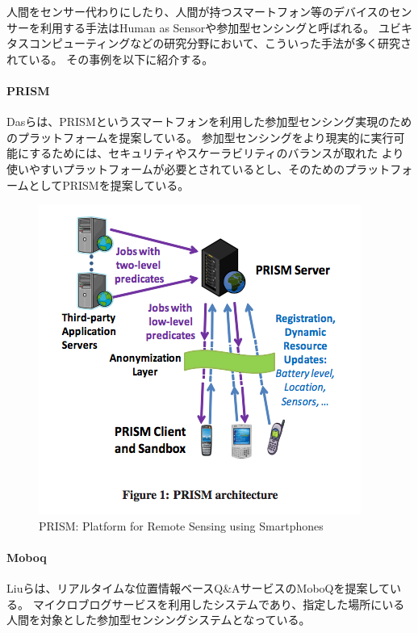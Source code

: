 人間をセンサー代わりにしたり、人間が持つスマートフォン等のデバイスのセンサーを利用する手法はHuman
as Sensorや参加型センシングと呼ばれる。
ユビキタスコンピューティングなどの研究分野において、こういった手法が多く研究されている。
その事例を以下に紹介する。

\paragraph{PRISM}\label{prism}

\mbox{}

Dasらは、PRISM\cite{prism}というスマートフォンを利用した参加型センシング実現のためのプラットフォームを提案している。
参加型センシングをより現実的に実行可能にするためには、セキュリティやスケーラビリティのバランスが取れた
より使いやすいプラットフォームが必要とされているとし、そのためのプラットフォームとしてPRISMを提案している。

\begin{figure}[htbp]
  \begin{center}
  \includegraphics[width=.6\linewidth,bb=0 0 399 384]{images/prism.png}
  \end{center}
  \caption{PRISM: Platform for Remote Sensing using Smartphones}
  \label{fig:prism}
\end{figure}

\paragraph{Moboq}\label{moboq}

\mbox{}

Liuらは、リアルタイムな位置情報ベースQ\&AサービスのMoboQを提案している\cite{moboq}。
マイクロブログサービスを利用したシステムであり、指定した場所にいる人間を対象とした参加型センシングシステムとなっている。

